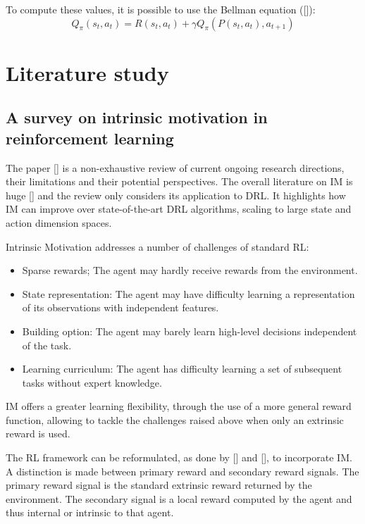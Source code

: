 \documentclass[conference]{IEEEtran}
\begin{document}
To compute these values, it is possible to use the Bellman equation ([\cite{sutton2018reinforcement}]):
\begin{equation*}
    Q_{\pi}(s_t, a_t) = R(s_t, a_t) + \gamma Q_{\pi}(P(s_t, a_t), a_{t+1})
\end{equation*}

\section{Literature study} \label{sec:literature_study}

\subsection{A survey on intrinsic motivation in reinforcement learning}

The paper [\cite{aubret2019survey}] is a non-exhaustive review of current ongoing research directions, their limitations and their potential perspectives. The overall literature on IM is huge [\cite{barto2013intrinsic}] and the review only considers its application to DRL. It highlights how IM can improve over state-of-the-art DRL algorithms, scaling to large state and action dimension spaces.

Intrinsic Motivation addresses a number of challenges of standard RL:
\begin{itemize}
    \item Sparse rewards; The agent may hardly receive rewards from the environment.
    \item State representation: The agent may have difficulty learning a representation of its observations with independent features.
    \item Building option: The agent may barely learn high-level decisions independent of the task.
    \item Learning curriculum: The agent has difficulty learning a set of subsequent tasks without expert knowledge.
\end{itemize}

IM offers a greater learning flexibility, through the use of a more general reward function, allowing to tackle the challenges raised above when only an extrinsic reward is used.

The RL framework can be reformulated, as done by [\cite{singh2010intrinsically}] and [\cite{barto2004intrinsically}], to incorporate IM. A distinction is made between primary reward and secondary reward signals. The primary reward signal is the standard extrinsic reward returned by the environment. The secondary signal is a local reward computed by the agent and thus internal or intrinsic to that agent.
\end{document}

